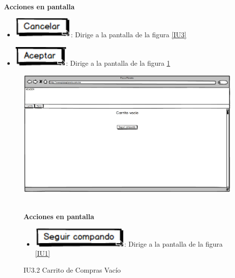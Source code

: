 	\noindent \textbf{\\Acciones en pantalla}
	
	\begin{itemize}
		
		\item \includegraphics[scale=0.500]{imagenes/iconografia/Cancelar.png}: Dirige a la pantalla de la figura \ref{IU3}
		\item \includegraphics[scale=0.500]{imagenes/iconografia/Aceptar.png}: Dirige a la pantalla de la figura \ref{IU3.2}
		
	\end{itemize}

\begin{figure}[h]
	
	\begin{center}				
		
		\includegraphics[scale=0.50]{imagenes/IUs/RegistroSolicitantes/iu1-IniciarSesion/IU3-2CarritoDeComprasVacio.png}
		\caption{IU3.2 Carrito de Compras Vacío}
		\label{IU3.2}
		
	\end{center}

	\noindent \textbf{\\Acciones en pantalla}
	
	\begin{itemize}
		
		\item \includegraphics[scale=0.500]{imagenes/iconografia/Seguir.png}: Dirige a la pantalla de la figura \ref{IU1}
		
	\end{itemize}
	
\end{figure}

